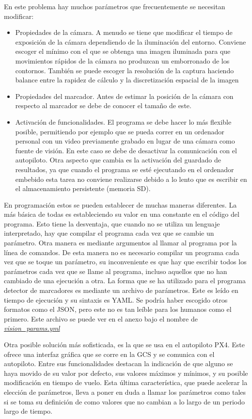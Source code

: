 En este problema hay muchos parámetros que frecuentemente se necesitan modificar:
\begin{itemize}
\item Propiedades de la cámara. A menudo se tiene que modificar el tiempo de exposición de la cámara dependiendo de la iluminación del entorno. Conviene escoger el mínimo con el que se obtenga una imagen iluminada para que movimientos rápidos de la cámara no produzcan un emborronado de los contornos. También se puede escoger la resolución de la captura haciendo balance entre la rapidez de cálculo y la discretización espacial de la imagen 
\item Propiedades del marcador. Antes de estimar la posición de la cámara con respecto al marcador se debe de conocer el tamaño de este.
\item Activación de funcionalidades. El programa se debe hacer lo más flexible posible, permitiendo por ejemplo que se pueda correr en un ordenador personal con un video previamente grabado en lugar de una cámara como fuente de visión. En este caso se debe de desactivar la comunicación con el autopiloto. Otra aspecto que cambia es la activación del guardado de resultados, ya que cuando el programa se esté ejecutando en el ordenador embebido esta tarea no conviene realizarse debido a lo lento que es escribir en el almacenamiento persistente (memoria SD).  
\end{itemize}

En programación estos se pueden establecer de muchas maneras diferentes. La más básica de todas es estableciendo su valor en una constante en el código del programa. Esto tiene la desventaja, que cuando no se utiliza un lenguaje interpretado, hay que compilar el programa cada vez que se cambie un parámetro. Otra manera es mediante argumentos al llamar al programa por la línea de comandos. De esta manera no es necesario compilar un programa cada vez que se toque un parámetro, su inconveniente es que hay que escribir todos los parámetros cada vez que se llame al programa, incluso aquellos que no han cambiado de una ejecución a otra. La forma que se ha utilizado para el programa detector de marcadores es mediante un archivo de parámetros. Este es leído en tiempo de ejecución  y su sintaxis es YAML. Se podría haber escogido otros formatos como el JSON, pero este no es tan leíble para los humanos como el primero. Este archivo se puede ver en el anexo bajo el nombre de \hyperref[sec:vision-params]{\textit{vision\_params.yml}} 

Otra posible solución más sofisticada, es la que se usa en el autopiloto PX4. Este ofrece una interfaz gráfica que se corre en la GCS y se comunica con el autopiloto. Entre sus funcionalidades destacan la indicación de que alguno se haya movido de su valor por defecto, sus valores máximos y mínimos, y su posible modificación en tiempo de vuelo. Esta última característica, que puede acelerar la elección de parámetros, lleva a poner en duda a llamar los parámetros como tales si se toma su definición de como valores que no cambian a lo largo de un periodo largo de tiempo.  

